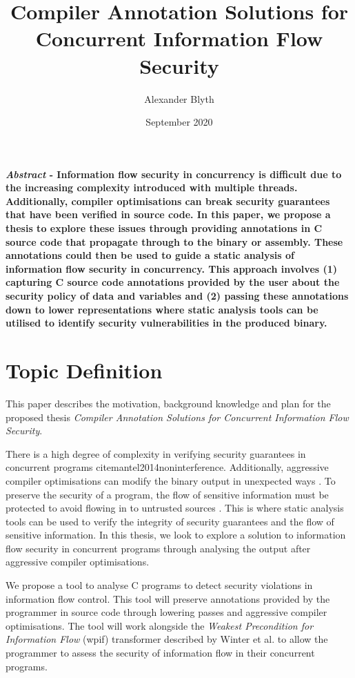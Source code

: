 \documentclass[twocolumn]{article}
\title{Compiler Annotation Solutions for Concurrent Information Flow Security}
\author{Alexander Blyth}
\date{September 2020}
\begin{document}
\maketitle


\textbf{\textit{Abstract} - Information flow security in concurrency is difficult due to the increasing complexity introduced with multiple threads. Additionally, compiler optimisations can break security guarantees that have been verified in source code. In this paper, we propose a thesis to explore these issues through providing annotations in C source code that propagate through to the binary or assembly. These annotations could then be used to guide a static analysis of information flow security in concurrency. This approach involves (1) capturing C source code annotations provided by the user about the security policy of data and variables and (2) passing these annotations down to lower representations where static analysis tools can be utilised to identify security vulnerabilities in the produced binary. }

\chapter{Topic Definition}
This paper describes the motivation, background knowledge and plan for the proposed thesis \textit{Compiler Annotation Solutions for Concurrent Information Flow Security}.

There is a high degree of complexity in verifying security guarantees in concurrent programs cite{mantel2014noninterference}\cite{smith2019value}\cite{vaughan2012secure}. Additionally, aggressive compiler optimisations can modify the binary output in unexpected ways \cite{d2015correctness}. To preserve the security of a program, the flow of sensitive information must be protected to avoid flowing in to untrusted sources \cite{balliu2014logics}. This is where static analysis tools can be used to verify the integrity of security guarantees and the flow of sensitive information. In this thesis, we look to explore a solution to information flow security in concurrent programs through analysing the output after aggressive compiler optimisations.

We propose a tool to analyse C programs to detect security violations in information flow control. This tool will preserve annotations provided by the programmer in source code through lowering passes and aggressive compiler optimisations. The tool will work alongside the \textit{Weakest Precondition for Information Flow} (wpif) transformer described by Winter et al. \cite{winter2020information} to allow the programmer to assess the security of information flow in their concurrent programs.
\end{document}
